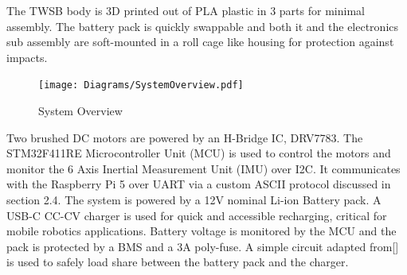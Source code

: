         The TWSB body is 3D printed out of PLA plastic in 3 parts for minimal assembly.
        The battery pack is quickly swappable and both it and the electronics sub assembly 
        are soft-mounted in a roll cage like housing for protection against impacts. 
        \begin{figure}[H]
            \centering
            \texttt{[image: Diagrams/SystemOverview.pdf]}
            \caption{System Overview}
        \end{figure}

        Two brushed DC motors are powered by an H-Bridge IC, DRV7783. 
        The STM32F411RE Microcontroller Unit (MCU) is used to control the 
        motors and monitor the 6 Axis Inertial Measurement Unit (IMU) over I2C. It communicates with the 
        Raspberry Pi 5 over UART via a custom ASCII protocol discussed in section 2.4. 
        The system is powered by a 12V nominal Li-ion Battery pack. A USB-C CC-CV charger is used for quick 
        and accessible recharging, critical for mobile robotics applications. 
        Battery voltage is monitored by the MCU and the pack is protected by a BMS and a 3A poly-fuse.
        A simple circuit adapted from[] is used to safely load share between the battery pack and the charger.

        \pagebreak{}
